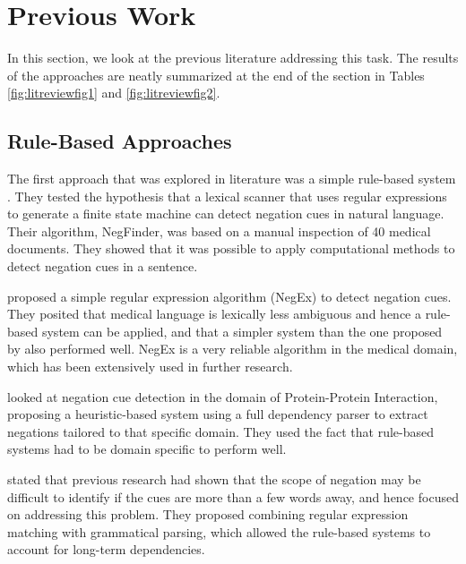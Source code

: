 \documentclass[10pt, a4paper]{article}
\begin{document}
\section{Previous Work}

In this section, we look at the previous literature addressing this task. The results of the approaches are neatly summarized at the end of the section in Tables \ref{fig:litreviewfig1} and \ref{fig:litreviewfig2}.

\subsection{Rule-Based Approaches}
The first approach that was explored in literature was a simple rule-based system \cite{mutalik}. They tested the hypothesis that a lexical scanner that uses regular expressions to generate a finite state machine can detect negation cues in natural language. Their algorithm, NegFinder, was based on a manual inspection of 40 medical documents. They showed that it was possible to apply computational methods to detect negation cues in a sentence.
\par {} proposed a simple regular expression algorithm (NegEx) to detect negation cues. They posited that medical language is lexically less ambiguous and hence a rule-based system can be applied, and that a simpler system than the one proposed by  also performed well. NegEx is a very reliable algorithm in the medical domain, which has been extensively used in further research.
\par {} looked at negation cue detection in the domain of Protein-Protein Interaction, proposing a heuristic-based system using a full dependency parser to extract negations tailored to that specific domain. They used the fact that rule-based systems had to be domain specific to perform well.
\par {} stated that previous research had shown that the scope of negation may be difficult to identify if the cues are more than a few words away, and hence focused on addressing this problem. They proposed combining regular expression matching with grammatical parsing, which allowed the rule-based systems to account for long-term dependencies.
\end{document}
